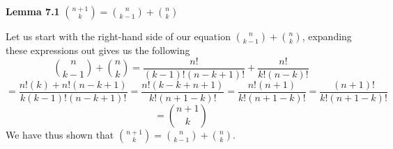 \textbf{Lemma 7.1} ${n +1 \choose k} = {n \choose k - 1} + {n \choose k}$

Let us start with the right-hand side of our equation ${n \choose k - 1} + {n \choose k}$, expanding these expressions out gives us the following 
$$ {n \choose k - 1} + {n \choose k} = \frac{n!}{(k-1)!(n-k+1)!} + \frac{n!}{k!(n-k)!}$$
$$ = \frac{n!(k) + n!(n-k+1)}{k(k-1)!(n-k+1)!} = \frac{n!(k -k + n + 1)}{k! (n+1 - k)!} = \frac{n!(n+1)}{k! (n+1 - k)!} = \frac{(n+1)!}{k! (n+1 - k)!}$$
$$ = {n+1 \choose k}$$
We have thus shown that ${n +1 \choose k} = {n \choose k - 1} + {n \choose k}$.